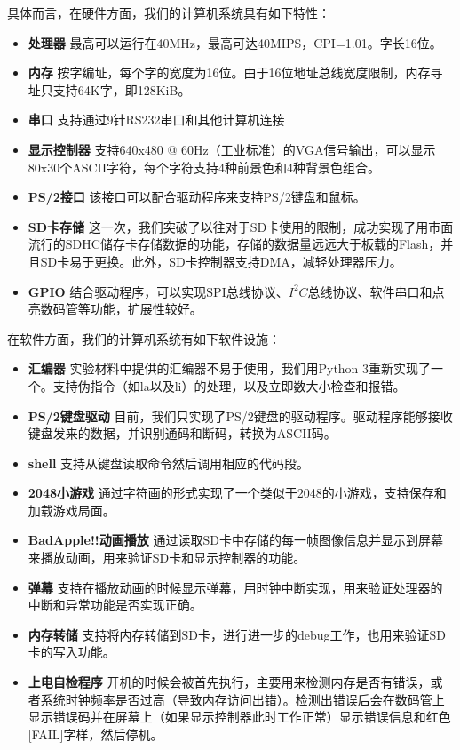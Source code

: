 \documentclass[11pt,utf8]{report}
\begin{document}
具体而言，在硬件方面，我们的计算机系统具有如下特性：
\begin{itemize}
\item \textbf{处理器} 最高可以运行在40MHz，最高可达40MIPS，CPI=1.01。字长16位。
\item \textbf{内存} 按字编址，每个字的宽度为16位。由于16位地址总线宽度限制，内存寻址只支持64K字，即128KiB。
\item \textbf{串口} 支持通过9针RS232串口和其他计算机连接
\item \textbf{显示控制器} 支持640x480 @ 60Hz（工业标准）的VGA信号输出，可以显示80x30个ASCII字符，每个字符支持4种前景色和4种背景色组合。
\item \textbf{PS/2接口} 该接口可以配合驱动程序来支持PS/2键盘和鼠标。
\item \textbf{SD卡存储} 这一次，我们突破了以往对于SD卡使用的限制，成功实现了用市面流行的SDHC储存卡存储数据的功能，存储的数据量远远大于板载的Flash，并且SD卡易于更换。此外，SD卡控制器支持DMA，减轻处理器压力。
\item \textbf{GPIO} 结合驱动程序，可以实现SPI总线协议、$I^2C$总线协议、软件串口和点亮数码管等功能，扩展性较好。
\end{itemize}

在软件方面，我们的计算机系统有如下软件设施：
\begin{itemize}
\item \textbf{汇编器} 实验材料中提供的汇编器不易于使用，我们用Python 3重新实现了一个。支持伪指令（如la以及li）的处理，以及立即数大小检查和报错。
\item \textbf{PS/2键盘驱动} 目前，我们只实现了PS/2键盘的驱动程序。驱动程序能够接收键盘发来的数据，并识别通码和断码，转换为ASCII码。
\item \textbf{shell} 支持从键盘读取命令然后调用相应的代码段。
\item \textbf{2048小游戏} 通过字符画的形式实现了一个类似于2048的小游戏，支持保存和加载游戏局面。
\item \textbf{BadApple!!动画播放} 通过读取SD卡中存储的每一帧图像信息并显示到屏幕来播放动画，用来验证SD卡和显示控制器的功能。
\item \textbf{弹幕} 支持在播放动画的时候显示弹幕，用时钟中断实现，用来验证处理器的中断和异常功能是否实现正确。
\item \textbf{内存转储} 支持将内存转储到SD卡，进行进一步的debug工作，也用来验证SD卡的写入功能。
\item \textbf{上电自检程序} 开机的时候会被首先执行，主要用来检测内存是否有错误，或者系统时钟频率是否过高（导致内存访问出错）。检测出错误后会在数码管上显示错误码并在屏幕上（如果显示控制器此时工作正常）显示错误信息和红色[FAIL]字样，然后停机。
\end{itemize}
\end{document}
